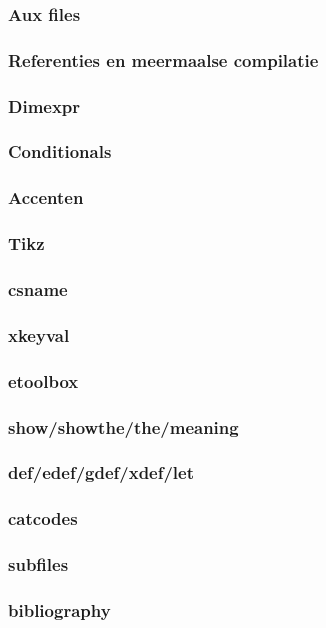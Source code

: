 \documentclass{cursuspresentatie}
\begin{document}
    \begin{frame}
        \frametitle{Aux files}
    \end{frame}

    \begin{frame}
        \frametitle{Referenties en meermaalse compilatie}
    \end{frame}

    \begin{frame}
        \frametitle{Dimexpr}
    \end{frame}

    \begin{frame}
        \frametitle{Conditionals}
    \end{frame}

    \begin{frame}
        \frametitle{Accenten}
    \end{frame}

    \begin{frame}
        \frametitle{Tikz}
    \end{frame}

    \begin{frame}
        \frametitle{csname}
    \end{frame}

    \begin{frame}
        \frametitle{xkeyval}
    \end{frame}

    \begin{frame}
        \frametitle{etoolbox}
    \end{frame}

    \begin{frame}
        \frametitle{show/showthe/the/meaning}
    \end{frame}

    \begin{frame}
        \frametitle{def/edef/gdef/xdef/let}
    \end{frame}

    \begin{frame}
        \frametitle{catcodes}
    \end{frame}

    \begin{frame}
        \frametitle{subfiles}
    \end{frame}

    \begin{frame}
        \frametitle{bibliography}
    \end{frame}
\end{document}
